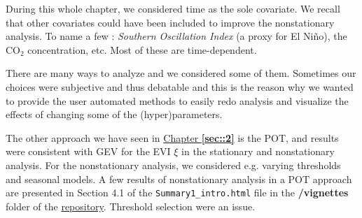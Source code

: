 During this whole chapter, we considered time as the sole covariate. We recall that other covariates could have been included to improve the nonstationary analysis. To name a few : \emph{Southern Oscillation Index} (a proxy for El Niño), the $\text{CO}_2$ concentration, etc. Most of these are time-dependent.

There are many ways to analyze and we considered some of them. Sometimes our choices were subjective and thus debatable and this is the reason why we wanted to provide the user automated methods to easily redo analysis and visualize the effects of changing some of the (hyper)parameters.

The other approach we have seen in \hyperref[sec::2]{Chapter \textbf{\ref{sec::2}}} is the POT, and results were consistent with GEV for the EVI $\xi$ in the stationary and nonstationary analysis. For the nonstationary analysis, we considered e.g. varying thresholds and seasonal models.
A few results of nonstationary analysis in a POT approach are presented in Section 4.1 of the \texttt{Summary1\_intro.html} file in the \textbf{/vignettes} folder of the \href{https://github.com/proto4426/PissoortThesis/}{repository}. Threshold selection were an issue.


